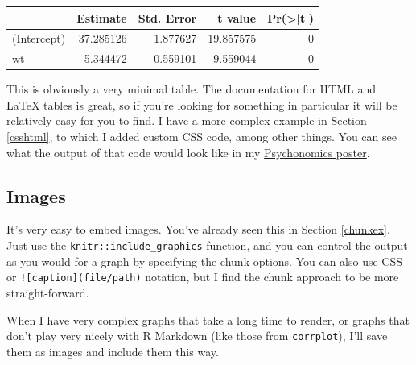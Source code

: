 \documentclass[
  openany]{book}
\newenvironment{Shaded}{\begin{snugshade}}{\end{snugshade}}
\newcommand{\CommentTok}[1]{\textcolor[rgb]{0.56,0.35,0.01}{\textit{#1}}}
\newcommand{\KeywordTok}[1]{\textcolor[rgb]{0.13,0.29,0.53}{\textbf{#1}}}
\newcommand{\NormalTok}[1]{#1}
\newcommand{\OperatorTok}[1]{\textcolor[rgb]{0.81,0.36,0.00}{\textbf{#1}}}
\newcommand{\StringTok}[1]{\textcolor[rgb]{0.31,0.60,0.02}{#1}}
\begin{document}
\begin{Shaded}
\end{Shaded}

\begin{table}[H]
\centering
\begin{tabular}{l|r|r|r|r}
\hline
  & Estimate & Std. Error & t value & Pr(>|t|)\\
\hline
(Intercept) & 37.285126 & 1.877627 & 19.857575 & 0\\
\hline
wt & -5.344472 & 0.559101 & -9.559044 & 0\\
\hline
\end{tabular}
\end{table}

This is obviously a very minimal table. The documentation for HTML and LaTeX tables is great, so if you're looking for something in particular it will be relatively easy for you to find. I have a more complex example in Section \ref{csshtml}, to which I added custom CSS code, among other things. You can see what the output of that code would look like in my \href{https://github.com/hollzzar/psychonomics-poster/blob/master/Psychonomics.pdf}{Psychonomics poster}.

\hypertarget{images}{%
\subsection{Images}\label{images}}

It's very easy to embed images. You've already seen this in Section \ref{chunkex}. Just use the \texttt{knitr::include\_graphics} function, and you can control the output as you would for a graph by specifying the chunk options. You can also use CSS or \texttt{!{[}caption{]}(file/path)} notation, but I find the chunk approach to be more straight-forward.

When I have very complex graphs that take a long time to render, or graphs that don't play very nicely with R Markdown (like those from \texttt{corrplot}), I'll save them as images and include them this way.
\end{document}
